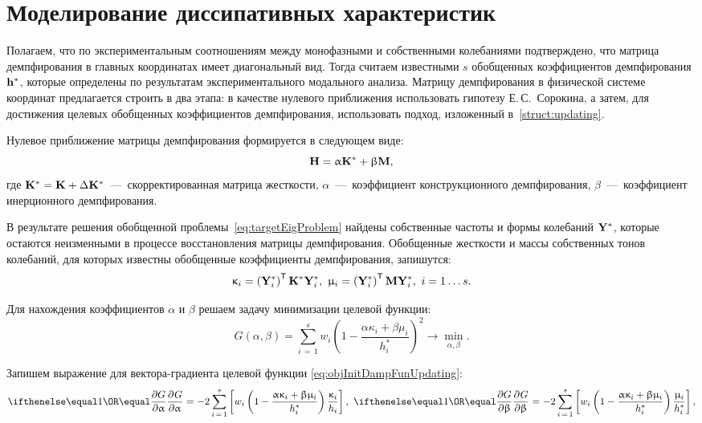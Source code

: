 \section{Моделирование диссипативных характеристик}

Полагаем, что по экспериментальным соотношениям между монофазными и собственными колебаниями подтверждено, что матрица демпфирования в главных координатах имеет диагональный вид. Тогда считаем известными $ s $ обобщенных коэффициентов демпфирования $ \mathbf{h} ^ \ast $, которые определены по результатам экспериментального модального анализа. Матрицу демпфирования в физической системе координат предлагается строить в два этапа: в качестве нулевого приближения использовать гипотезу Е.\,С.~Сорокина, а затем, для достижения целевых обобщенных коэффициентов демпфирования, использовать подход, изложенный в~\ref{struct:updating}.

Нулевое приближение матрицы демпфирования формируется в следующем виде:
\begin{equation}
	\mathbf{H} = \upalpha \mathbf{K} ^ \ast + \upbeta \mathbf{M},
\end{equation}
где $ \mathbf{K} ^ \ast = \mathbf{K} + \Delta \mathbf{K} ^ \ast $~---~скорректированная матрица жесткости, $ \alpha $~---~коэффициент конструкционного демпфирования, $ \beta $~---~коэффициент инерционного демпфирования.

В результате решения обобщенной проблемы~\eqref{eq:targetEigProblem} найдены собственные частоты и формы колебаний $ \mathbf{Y} ^ \ast $, которые остаются неизменными в процессе восстановления матрицы демпфирования. Обобщенные жесткости и массы собственных тонов колебаний, для которых известны обобщенные коэффициенты демпфирования, запишутся:
\begin{equation}
	\upkappa_i = \left( \mathbf{Y}_i ^ \ast \right) ^ \mathsf{T} \mathbf{K} ^ \ast \mathbf{Y}_i ^ \ast, \
	\upmu_i = \left( \mathbf{Y}_i ^ \ast \right) ^ \mathsf{T} \mathbf{M} \mathbf{Y}_i ^ \ast, \ i = 1 \hdots s. 
\end{equation}

Для нахождения коэффициентов $ \alpha $ и $ \beta $ решаем задачу минимизации целевой функции:
\begin{equation}
	G(\alpha, \beta) = \sum \limits_{i\,=\,1} ^ s w_i \left( 1 - \frac{\alpha \kappa_i + \beta \mu_i}{h_i ^ \ast} \right)^2 \rightarrow \min_{\alpha, \beta}.
	\label{eq:objInitDampFunUpdating}
\end{equation}

Запишем выражение для вектора-градиента целевой функции \eqref{eq:objInitDampFunUpdating}:
\begin{equation*}
	\partDer{G}{\alpha}{} = -2 \sum_{i\,=\,1} ^ s \sbrackets{w_i \rbrackets{1 - \frac{\alpha \kappa_i + \beta \mu_i}{h_i ^ \ast}} \frac{\kappa_i}{h_i}}, \
	 \partDer{G}{\beta}{} = -2 \sum_{i\,=\,1} ^ s \sbrackets{w_i \rbrackets{1 - \frac{\alpha \kappa_i + \beta \mu_i}{h_i ^ \ast}} \frac{\mu_i}{h_i ^ \ast}},
\end{equation*}

